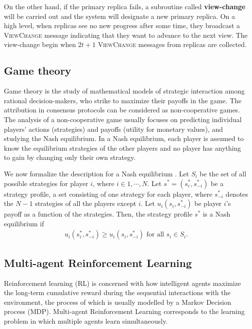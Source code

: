 \documentclass[a4paper,11pt]{article}
\begin{document}
On the other hand, if the primary replica fails, a subroutine called \textbf{view-change} will be carried out and the system will designate a new primary replica. On a high level, when replicas see no new progress after some time, they broadcast a \textsc{ViewChange} message indicating that they want to advance to the next view. The view-change begin when $2t+1$ \textsc{ViewChange} messages from replicas are collected. 

\subsection{Game theory}\label{sec:gametheory}
Game theory is the study of mathematical models of strategic interaction among rational decision-makers, who strike to maximize their payoffs in the game. The attribution in consensus protocols can be considered as non-cooperative games. The analysis of a non-cooperative game usually focuses on predicting individual players' actions (strategies) and payoffs (utility for monetary values), and studying the Nash equilibrium. In a Nash equilibrium, each player is assumed to know the equilibrium strategies of the other players and no player has anything to gain by changing only their own strategy. 

We now formalize the description for a Nash equilibrium \cite{Nash-def}. Let $S_i$ be the set of all possible strategies for player $i$, where $i\in{1, \cdots, N}$. Let $s^* = (s^*_i, s^*_{-i})$ be a strategy profile, a set consisting of one strategy for each player, where $s^*_{-i}$ denotes the $N-1$ strategies of all the players except $i$. Let $u_i(s_i, s^*_{-i})$ be player $i$'s payoff as a function of the strategies. Then, the strategy profile $s^*$ is a Nash equilibrium if 
\begin{align}
    u_i(s^*_i, s^*_{-i}) \geq u_i(s_i, s^*_{-i}) \text{ for all }s_i\in S_i.
\end{align}
    
\subsection{Multi-agent Reinforcement Learning}\label{sec:marl}
Reinforcement learning (RL) is concerned with how intelligent agents maximize the long-term cumulative reward during the sequential interactions with the environment, the process of which is usually modelled by a Markov Decision process (MDP). Multi-agent Reinforcement Learning corresponds to the learning problem in which multiple agents learn simultaneously. 
\end{document}
